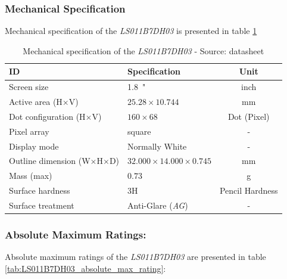\documentclass[report.tex]{subfiles}
\begin{document}
\subsubsection{Mechanical Specification}

Mechanical specification of the \textit{LS011B7DH03} is presented in table \ref{tab:LS011B7DH03_mech_spec}

\begin{table}[H]
\centering
\begin{tabular}{|l|l|c|}\hline
\textbf{ID} & \textbf{Specification} & \textbf{Unit}\\\hline
Screen size & \SI{1.8}{"} & inch\\\hline
Active area (H$\times$V)& $25.28 \times 10.744$ & \si{\milli\meter}\\\hline
Dot configuration (H$\times$V) & $160 \times 68$ & Dot (Pixel)\\\hline
Pixel array & square & -\\\hline
Display mode & Normally White & -\\\hline
Outline dimension (W$\times$H$\times$D) & $32.000 \times 14.000 \times 0.745$ & \si{\milli\meter}\\\hline
Mass (max) & $0.73$ & \si{\gram}\\\hline
Surface hardness & $3\text{H}$ & Pencil Hardness \\\hline
Surface treatment & Anti-Glare (\textit{AG}) & - \\\hline
\end{tabular}
\caption{Mechanical specification of the \textit{LS011B7DH03} - Source: datasheet\cite{LS011B7DH03}}
\label{tab:LS011B7DH03_mech_spec}
\end{table}

\subsubsection{Absolute Maximum Ratings:}

Absolute maximum ratings of the \textit{LS011B7DH03} are presented in table \ref{tab:LS011B7DH03_absolute_max_rating}:
\end{document}
